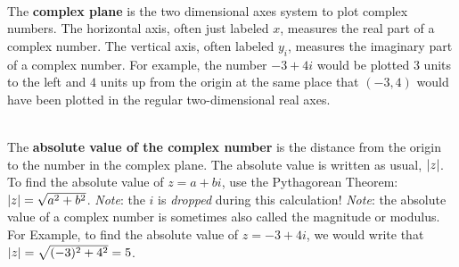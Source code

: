 \begin{myDefinition}~\\[0.5mm]
The \textbf{complex plane} is the two dimensional axes system to plot complex numbers. The horizontal axis, often just labeled $x$, measures the real part of a complex number. The vertical axis, often labeled $y_i$, measures the imaginary part of a complex number. 
\newline For example, the number $-3+4i$ would be plotted $3$ units to the left and $4$ units up from the origin at the same place that $(-3,4)$ would have been plotted in the regular two-dimensional real axes.
\end{myDefinition}

\begin{myDefinition}~\\[0.5mm]
The \textbf{absolute value of the complex number} is the distance from the origin to the number in the complex plane. The absolute value is written as usual, $\lvert z\rvert$. To find the absolute value of $z=a+bi$, use the Pythagorean Theorem: $\lvert z\rvert=\sqrt{a^2+b^2}$. 
\newline \emph{Note}: the $i$ is \emph{dropped} during this calculation! 
\newline \emph{Note}: the absolute value of a complex number is sometimes also called the magnitude or modulus.
\newline For Example, to find the absolute value of $z=-3+4i$, we would write that $\lvert z\rvert=\sqrt{(-3)^2+4^2}=5$. 
\end{myDefinition}

